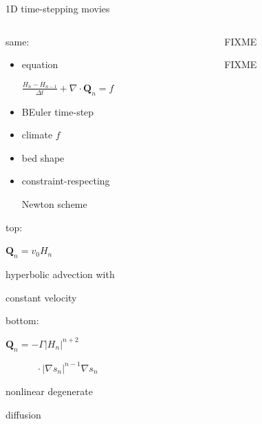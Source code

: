 \documentclass[xcolor={dvipsnames}]{beamer}
\newcommand\bQ{\mathbf{Q}}
\newcommand\Div{\nabla\cdot}
\newcommand\grad{\nabla}
\begin{document}
\begin{frame}{1D time-stepping movies}

\begin{columns}
\begin{column}{0.35\textwidth}
\alert{same:}

\begin{itemize}
\scriptsize
\item equation

\tiny
\hspace{-10mm} $\frac{H_n-H_{n-1}}{\Delta t} + \Div\bQ_n = f$
\scriptsize

\item BEuler time-step
\item climate $f$
\item bed shape
\item constraint-respecting

Newton scheme
\end{itemize}

\vspace{2mm}

\alert{top:}

\scriptsize

\medskip
$\bQ_n = v_0 H_n$

hyperbolic advection with

constant velocity

\vspace{5mm}

\normalsize 

\alert{bottom:}

\scriptsize

\medskip
$\bQ_n = - \Gamma |H_n|^{n+2}$

$\phantom{bQ_n = }\, \cdot |\grad s_n|^{n-1} \grad s_n$

nonlinear degenerate

diffusion
\end{column}
\begin{column}{0.4\textwidth}
\hspace{-15mm}
FIXME

\medskip
\hspace{-15mm}
FIXME

\end{column}
\end{columns}
\end{frame}
\end{document}
